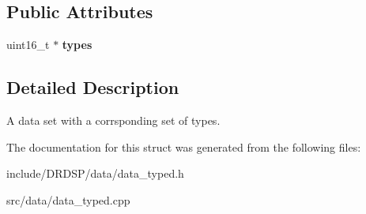 \subsection*{Public Attributes}
\begin{DoxyCompactItemize}
\item 
\hypertarget{struct_d_r_d_s_p_1_1_data_set_typed_aa1d334ce3351a184e8234276b29d091e}{uint16\-\_\-t $\ast$ {\bfseries types}}\label{struct_d_r_d_s_p_1_1_data_set_typed_aa1d334ce3351a184e8234276b29d091e}

\end{DoxyCompactItemize}


\subsection{Detailed Description}
A data set with a corrsponding set of types. 

The documentation for this struct was generated from the following files\-:\begin{DoxyCompactItemize}
\item 
include/\-D\-R\-D\-S\-P/data/data\-\_\-typed.\-h\item 
src/data/data\-\_\-typed.\-cpp\end{DoxyCompactItemize}
